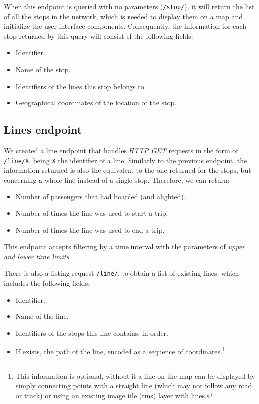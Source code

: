     When this endpoint is queried with no parameters (\texttt{/stop/}), it will return the list of all the stops in the network, which is needed to display them on a map and initialize the user interface components. Consequently, the information for each stop returned by this query will consist of the following fields:
    
    \begin{itemize}
        \item Identifier.
        \item Name of the stop.
        \item Identifiers of the lines this stop belongs to.
        \item Geographical coordinates of the location of the stop.
    \end{itemize}
    
    \subsection{Lines endpoint}
    We created a line endpoint that handles {\em HTTP GET} requests in the form of \texttt{/line/X}, being \texttt{X} the identifier of a line. Similarly to the previous endpoint, the information returned is also the equivalent to the one returned for the stops, but concerning a whole line instead of a single stop. Therefore, we can return:
    
    \begin{itemize}
        \item Number of passengers that had boarded (and alighted).
        \item Number of times the line was used to start a trip.
        \item Number of times the line was used to end a trip.
    \end{itemize}
    
    This endpoint accepts filtering by a time interval with the parameters of \textit{upper and lower time limits}.
    
    \medskip
    There is also a listing request \texttt{/line/}, to obtain a list of existing lines, which includes the following fields:
    
    \begin{itemize}
        \item Identifier.
        \item Name of the line.
        \item Identifiers of the stops this line contains, in order.
        \item If exists, the path of the line, encoded as a sequence of coordinates.\footnote{This information is optional, without it a line on the map can be displayed by simply connecting points with a straight line (which may not follow any road or track) or using an existing image tile (\gls{tms}) layer with lines.}
    \end{itemize}
    
